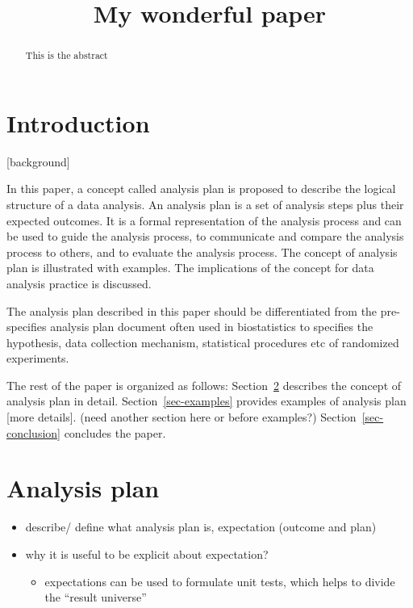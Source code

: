 \documentclass[
]{jds}
\title{My wonderful paper}
\author{}
\date{}
\providecommand{\tightlist}{%
  \setlength{\itemsep}{0pt}\setlength{\parskip}{0pt}}\usepackage{longtable,booktabs,array}
\begin{document}
\maketitle
\begin{abstract}
This is the abstract
\end{abstract}

\section{Introduction}\label{introduction}

{[}background{]}

In this paper, a concept called analysis plan is proposed to describe
the logical structure of a data analysis. An analysis plan is a set of
analysis steps plus their expected outcomes. It is a formal
representation of the analysis process and can be used to guide the
analysis process, to communicate and compare the analysis process to
others, and to evaluate the analysis process. The concept of analysis
plan is illustrated with examples. The implications of the concept for
data analysis practice is discussed.

The analysis plan described in this paper should be differentiated from
the pre-specifies analysis plan document often used in biostatistics to
specifies the hypothesis, data collection mechanism, statistical
procedures etc of randomized experiments.

The rest of the paper is organized as follows: Section~\ref{sec-plan}
describes the concept of analysis plan in detail.
Section~\ref{sec-examples} provides examples of analysis plan {[}more
details{]}. (need another section here or before examples?)
Section~\ref{sec-conclusion} concludes the paper.

\section{Analysis plan}\label{sec-plan}

\begin{itemize}
\item
  describe/ define what analysis plan is, expectation (outcome and plan)
\item
  why it is useful to be explicit about expectation?

  \begin{itemize}
  \tightlist
  \item
    expectations can be used to formulate unit tests, which helps to
    divide the ``result universe''
  \end{itemize}
\end{itemize}
\end{document}
